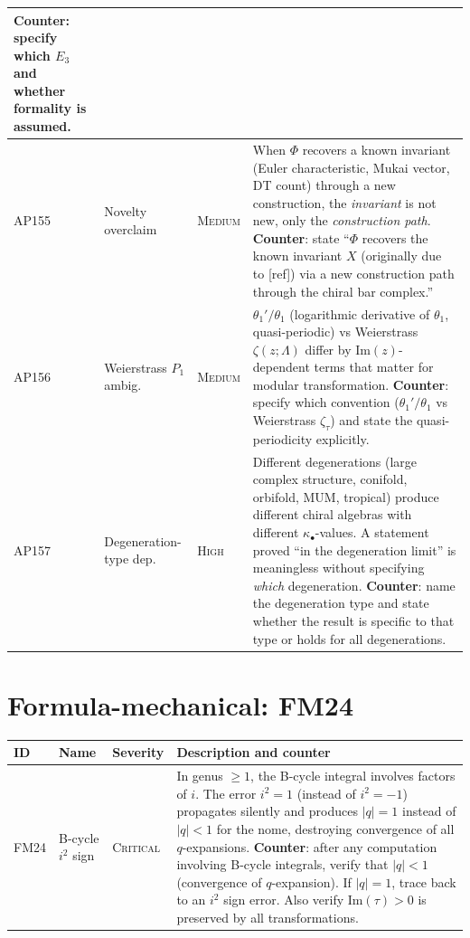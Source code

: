 {\begin{longtable}{@{}p{1.6cm}p{2.4cm}lp{7.4cm}@{}}
  \textbf{Counter}: specify which $E_3$ and whether
  formality is assumed. \\
\midrule
AP155 & Novelty overclaim & \textsc{Medium} &
  When $\Phi$ recovers a known invariant (Euler
  characteristic, Mukai vector, DT count) through a new
  construction, the \emph{invariant} is not new, only the
  \emph{construction path}.
  \textbf{Counter}: state ``$\Phi$ recovers the known
  invariant $X$ (originally due to [ref]) via a new
  construction path through the chiral bar complex.'' \\
\midrule
AP156 & Weierstrass $P_1$ ambig. & \textsc{Medium} &
  $\theta_1'/\theta_1$ (logarithmic derivative of $\theta_1$,
  quasi-periodic) vs Weierstrass $\zeta(z; \Lambda)$ differ
  by $\mathrm{Im}(z)$-dependent terms that matter for modular
  transformation.
  \textbf{Counter}: specify which convention
  ($\theta_1'/\theta_1$ vs Weierstrass $\zeta_\tau$) and
  state the quasi-periodicity explicitly. \\
\midrule
AP157 & Degeneration-type dep. & \textsc{High} &
  Different degenerations (large complex structure, conifold,
  orbifold, MUM, tropical) produce different chiral algebras
  with different $\kappa_\bullet$-values.  A statement proved
  ``in the degeneration limit'' is meaningless without
  specifying \emph{which} degeneration.
  \textbf{Counter}: name the degeneration type and state
  whether the result is specific to that type or holds for
  all degenerations. \\
\bottomrule
\end{longtable}
}%

\section{Formula-mechanical: FM24}
\label{sec:ap-fm24-full}

{%
\small
\begin{longtable}{@{}p{1.6cm}p{2.4cm}lp{7.4cm}@{}}
\toprule
\textbf{ID} & \textbf{Name} & \textbf{Severity}
  & \textbf{Description and counter} \\
\midrule
\endhead
FM24 & B-cycle $i^2$ sign & \textsc{Critical} &
  In genus $\ge 1$, the B-cycle integral involves factors of
  $i$.  The error $i^2 = 1$ (instead of $i^2 = -1$)
  propagates silently and produces $|q| = 1$ instead of
  $|q| < 1$ for the nome, destroying convergence of all
  $q$-expansions.
  \textbf{Counter}: after any computation involving B-cycle
  integrals, verify that $|q| < 1$ (convergence of
  $q$-expansion).  If $|q| = 1$, trace back to an $i^2$ sign
  error.  Also verify $\mathrm{Im}(\tau) > 0$ is preserved
  by all transformations. \\
\bottomrule
\end{longtable}
}%

